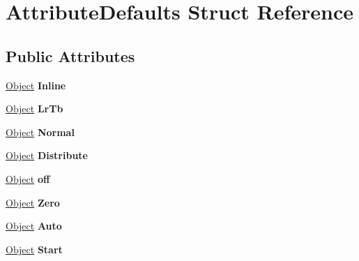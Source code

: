 \hypertarget{struct_attribute_defaults}{}\section{Attribute\+Defaults Struct Reference}
\label{struct_attribute_defaults}
\subsection*{Public Attributes}
\begin{DoxyCompactItemize}
\item 
\mbox{\label{struct_attribute_defaults_a8b9fbc2d7ef3909b893a6e080c133f99}} 
\hyperlink{class_object}{Object} {\bfseries Inline}
\item 
\mbox{\label{struct_attribute_defaults_a0595ad611693ccab3da8825909f8e4f2}} 
\hyperlink{class_object}{Object} {\bfseries Lr\+Tb}
\item 
\mbox{\label{struct_attribute_defaults_ae3cc89e10ce60cf413746216dfa378f3}} 
\hyperlink{class_object}{Object} {\bfseries Normal}
\item 
\mbox{\label{struct_attribute_defaults_a568eb9a70027e329fb310205f53581ea}} 
\hyperlink{class_object}{Object} {\bfseries Distribute}
\item 
\mbox{\label{struct_attribute_defaults_a0207950180e299db788f424b8d179edb}} 
\hyperlink{class_object}{Object} {\bfseries off}
\item 
\mbox{\label{struct_attribute_defaults_a613766a829e19d8aa7a54dfd7f875a20}} 
\hyperlink{class_object}{Object} {\bfseries Zero}
\item 
\mbox{\label{struct_attribute_defaults_ab7aa432c3dd5da2034483bc28e6f6e1b}} 
\hyperlink{class_object}{Object} {\bfseries Auto}
\item 
\mbox{\label{struct_attribute_defaults_a967bebcb4086335e5a7a58996234a043}} 
\hyperlink{class_object}{Object} {\bfseries Start}
\item 

\end{DoxyCompactItemize}
